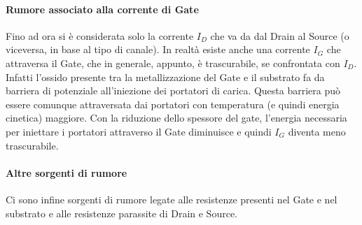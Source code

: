 \paragraph*{Rumore associato alla corrente di Gate}
Fino ad ora si è considerata solo la corrente $I_D$ che va da dal Drain al Source (o viceversa, in base al tipo di canale). In realtà esiste anche una corrente $I_G$ che attraversa il Gate, che in generale, appunto, è trascurabile, se confrontata con  $I_D$. Infatti l'ossido presente tra la metallizzazione del Gate e il substrato fa da barriera di potenziale all'iniezione dei portatori di carica. Questa barriera può essere comunque attraversata dai portatori con temperatura (e quindi energia cinetica) maggiore. Con la riduzione dello spessore del gate, l'energia necessaria per iniettare i portatori attraverso il Gate diminuisce e quindi $I_G$ diventa meno trascurabile.

\paragraph*{Altre sorgenti di rumore}
Ci sono infine sorgenti di rumore legate alle resistenze presenti nel Gate e nel substrato e alle resistenze parassite di Drain e Source.